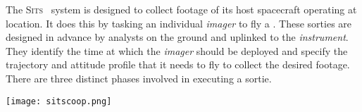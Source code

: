 \documentclass{tufte-handout}
\newcommand{\sitsshort}[0]{\textsc{Sits}}%
\begin{document}
The \sitsshort~ system is designed to collect footage of its host spacecraft
operating at location. It does this by tasking an individual
\textit{imager} to fly a . These sorties are designed
in advance by analysts on the ground and uplinked to the \textit{instrument}. They identify
the time at which the \textit{imager} should be deployed and specify the trajectory and 
attitude profile that it needs to fly to collect the desired footage. There are 
three distinct phases involved in executing a sortie.

\begin{marginfigure}[-1.5 in]%
  \texttt{[image: sitscoop.png]}
  \caption{\sitsshort~ \textit{imager} after deployment from the \textit{instrument} as it collects footage of the
  host spacecraft.}
  \label{fig:sitscoop}
\end{marginfigure}
\end{document}
